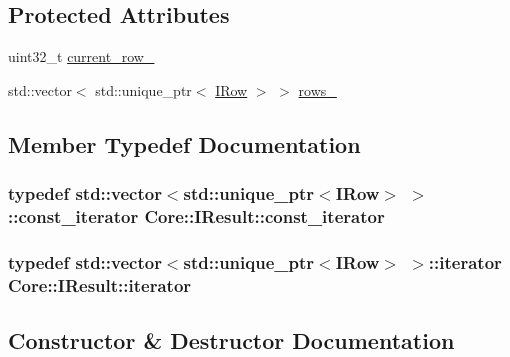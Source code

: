 \subsection*{Protected Attributes}
\begin{DoxyCompactItemize}
\item 
uint32\+\_\+t \hyperlink{classCore_1_1IResult_a43afac5e5868af6111ae94d01ae98b28}{current\+\_\+row\+\_\+}
\item 
std\+::vector$<$ std\+::unique\+\_\+ptr$<$ \hyperlink{classCore_1_1IRow}{I\+Row} $>$ $>$ \hyperlink{classCore_1_1IResult_a80b0e69abcc0fdc6a4efa005ae81834c}{rows\+\_\+}
\end{DoxyCompactItemize}


\subsection{Member Typedef Documentation}
\subsubsection[{\texorpdfstring{const\+\_\+iterator}{const_iterator}}]{\setlength{\rightskip}{0pt plus 5cm}typedef std\+::vector$<$std\+::unique\+\_\+ptr$<${\bf I\+Row}$>$ $>$\+::{\bf const\+\_\+iterator} {\bf Core\+::\+I\+Result\+::const\+\_\+iterator}}\hypertarget{classCore_1_1IResult_a4f549868ef8d40c199565efd7b89f45c}{}\label{classCore_1_1IResult_a4f549868ef8d40c199565efd7b89f45c}
\subsubsection[{\texorpdfstring{iterator}{iterator}}]{\setlength{\rightskip}{0pt plus 5cm}typedef std\+::vector$<$std\+::unique\+\_\+ptr$<${\bf I\+Row}$>$ $>$\+::{\bf iterator} {\bf Core\+::\+I\+Result\+::iterator}}\hypertarget{classCore_1_1IResult_a1b8d24ea97ebbe669bb13c09ad5ad796}{}\label{classCore_1_1IResult_a1b8d24ea97ebbe669bb13c09ad5ad796}


\subsection{Constructor \& Destructor Documentation}
